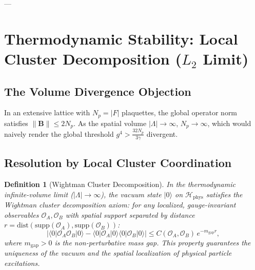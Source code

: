 \documentclass[11pt,reqno]{article}
\newtheorem{definition}[theorem]{Definition}
\begin{document}
---

\section{Thermodynamic Stability: Local Cluster Decomposition ($L_2$ Limit)}
\label{sec:thermodynamic}

\subsection{The Volume Divergence Objection}
In an extensive lattice with $N_p = |F|$ plaquettes, the global operator norm satisfies $\|\mathbf{B}\| \le 2 N_p$. As the spatial volume $|\Lambda| \to \infty$, $N_p \to \infty$, which would naively render the global threshold $g^4 > \frac{32 N_p}{3 \gamma}$ divergent.

\subsection{Resolution by Local Cluster Coordination}

\begin{definition}[Wightman Cluster Decomposition]
\label{def:wightman_cluster_decomposition}
In the thermodynamic infinite-volume limit ($|\Lambda| \to \infty$), the vacuum state $|0\rangle$ on $\mathcal{H}_{\mathrm{phys}}$ satisfies the Wightman cluster decomposition axiom: for any localized, gauge-invariant observables $\mathcal{O}_A, \mathcal{O}_B$ with spatial support separated by distance $r = \mathrm{dist}(\mathrm{supp}(\mathcal{O}_A), \mathrm{supp}(\mathcal{O}_B))$:
\begin{equation}
    \label{eq:wightman_cluster_decay}
    \left| \langle 0 | \mathcal{O}_A \mathcal{O}_B | 0 \rangle - \langle 0 | \mathcal{O}_A | 0 \rangle \langle 0 | \mathcal{O}_B | 0 \rangle \right| \le C(\mathcal{O}_A, \mathcal{O}_B) \, e^{-m_{\mathrm{gap}} r},
\end{equation}
where $m_{\mathrm{gap}} > 0$ is the non-perturbative mass gap. This property guarantees the uniqueness of the vacuum and the spatial localization of physical particle excitations.
\end{definition}
\end{document}
